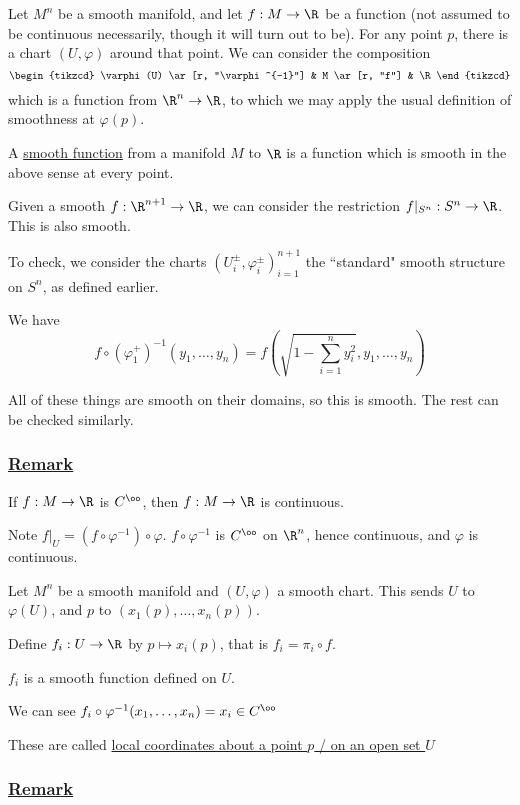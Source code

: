 \documentclass[x11names,reqno,14pt]{extarticle}
\renewcommand{\phi}{\varphi}
\begin{document}
Let $M^n$ be a smooth manifold, and let $f:M\to\R$ be a function (not assumed to be continuous necessarily, though it will turn out to be). For any point $p$, there is a chart $(U, \phi)$ around that point. We can consider the composition
\[
\begin{tikzcd}
\phi(U) \ar[r, "\phi^{-1}"] & M \ar[r, "f"] & \R
\end{tikzcd}
\]
which is a function from $\R^n\to\R$, to which we may apply the usual definition of smoothness at $\phi(p)$. 


A \underline{smooth function} from a manifold $M$ to $\R$ is a function which is smooth in the above sense at every point. 

\exm

Given a smooth $f:\R^{n + 1}\to\R$, we can consider the restriction $f|_{S^n}:S^n\to\R$. This is also smooth. 

To check, we consider the charts $(U_i^\pm, \phi_i^\pm)_{i=1}^{n + 1}$ the ``standard" smooth structure on $S^n$, as defined earlier. 

We have 
\[
f\circ(\phi_1^+)^{-1}(y_1,\dots,y_n)= f\left(\sqrt{1 - \sum_{i=1}^ny_i^2}, y_1, \dots, y_n\right)
\]

All of these things are smooth on their domains, so this is smooth. The rest can be checked similarly. 

\subsubsection*{\underline{Remark}}

If $f:M\to\R$ is $C^\oo$, then $f:M\to\R$ is continuous. 

Note $f|_U = (f\circ\phi^{-1})\circ\phi$. $f\circ\phi^{-1}$ is $C^\oo$ on $\R^n$, hence continuous, and $\phi$ is continuous. 


Let $M^n$ be a smooth manifold and $(U,\phi)$ a smooth chart. This sends $U$ to $\phi(U)$, and $p$ to $(x_1(p),\dots,x_n(p))$. 

Define $f_i:U\to\R$ by $p\mapsto x_i(p)$, that is $f_i = \pi_i\circ f$. 

$f_i$ is a smooth function defined on $U$. 

We can see $f_i \circ \phi^{-1}(x_1,\dots, x_n) = x_i \in C^\oo$

These are called \underline{local coordinates about a point $p$ / on an open set $U$}

\subsubsection*{\underline{Remark}}
\end{document}
